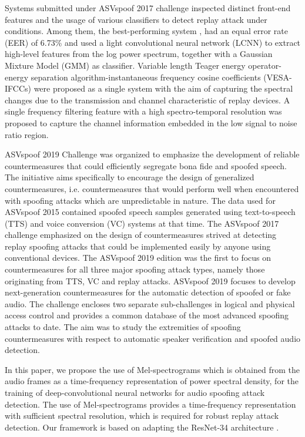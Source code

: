 \documentclass[a4paper]{article}
\begin{document}
    Systems submitted under ASVspoof 2017 \cite{asvspoof17} challenge inspected distinct front-end features and the usage of various classifiers to detect replay attack under conditions. Among them, the best-performing system \cite{paper4}, had an equal error rate (EER) of 6.73\% and used a light convolutional neural network (LCNN) to extract high-level features from the log power spectrum, together with a Gaussian Mixture Model (GMM) as classifier. Variable length Teager energy operator-energy separation algorithm-instantaneous frequency cosine coefficients (VESA-IFCCs) \cite{paper5} were proposed as a single system with the aim of capturing the spectral changes due to the transmission and channel characteristic of replay devices. A single frequency filtering feature with a high spectro-temporal resolution was proposed \cite{paper6} to capture the channel information embedded in the low signal to noise ratio region.

    ASVspoof 2019 \cite{asvspoof-org} Challenge was organized to emphasize the development of reliable countermeasures that could efficiently segregate bona fide and spoofed speech. The initiative aims specifically to encourage the design of generalized countermeasures, i.e. countermeasures that would perform well when encountered with spoofing attacks which are unpredictable in nature. The data used for ASVspoof 2015 \cite{asvspoof15} contained spoofed speech samples generated using text-to-speech (TTS) and voice conversion (VC) systems at that time. The ASVspoof 2017 \cite{asvspoof17} challenge emphasized on the design of countermeasures strived at detecting replay spoofing attacks that could be implemented easily by anyone using conventional devices. The ASVspoof 2019 \cite{asvspoof-org} edition was the first to focus on countermeasures for all three major spoofing attack types, namely those originating from TTS, VC and replay attacks. ASVspoof 2019 \cite{asvspoof-org} focuses to develop next-generation countermeasures for the automatic detection of spoofed or fake audio. The challenge encloses two separate sub-challenges in logical and physical access control and provides a common database of the most advanced spoofing attacks to date. The aim was to study the extremities of spoofing countermeasures with respect to automatic speaker verification and spoofed audio detection.
    
    In this paper, we propose the use of Mel-spectrograms \cite{melref} which is obtained from the audio frames as a time-frequency representation of power spectral density, for the training of deep-convolutional neural networks for audio spoofing attack detection. The use of Mel-spectrograms provides a time-frequency representation with sufficient spectral resolution, which is required for robust replay attack detection. Our framework is based on adapting the ResNet-34 architecture \cite{resnet}.
\end{document}
